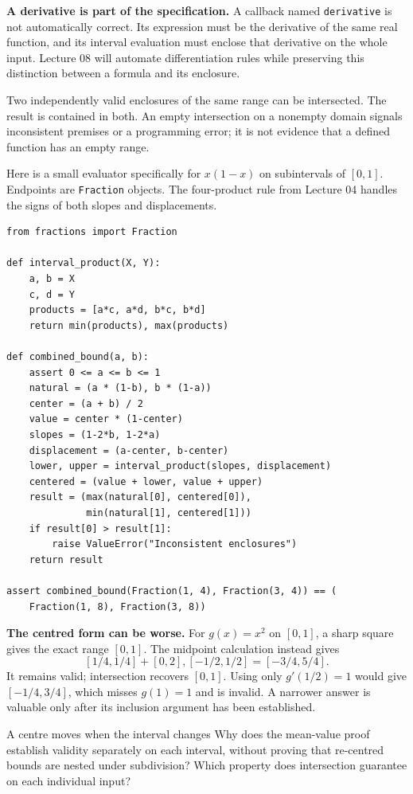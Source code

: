 \textbf{A derivative is part of the specification.} A callback named
\texttt{derivative} is not automatically correct. Its expression must be the
derivative of the same real function, and its interval evaluation must enclose
that derivative on the whole input. Lecture 08 will automate differentiation
rules while preserving this distinction between a formula and its enclosure.

\newpage
{}
Two independently valid enclosures of the same range can be intersected.
The result is contained in both. An empty intersection on a nonempty domain
signals inconsistent premises or a programming error; it is not evidence that
a defined function has an empty range.

Here is a small evaluator specifically for $x(1-x)$ on subintervals of $[0,1]$.
Endpoints are \texttt{Fraction} objects. The four-product rule from Lecture 04
handles the signs of both slopes and displacements.
\begin{lstlisting}
from fractions import Fraction

def interval_product(X, Y):
    a, b = X
    c, d = Y
    products = [a*c, a*d, b*c, b*d]
    return min(products), max(products)

def combined_bound(a, b):
    assert 0 <= a <= b <= 1
    natural = (a * (1-b), b * (1-a))
    center = (a + b) / 2
    value = center * (1-center)
    slopes = (1-2*b, 1-2*a)
    displacement = (a-center, b-center)
    lower, upper = interval_product(slopes, displacement)
    centered = (value + lower, value + upper)
    result = (max(natural[0], centered[0]),
              min(natural[1], centered[1]))
    if result[0] > result[1]:
        raise ValueError("Inconsistent enclosures")
    return result

assert combined_bound(Fraction(1, 4), Fraction(3, 4)) == (
    Fraction(1, 8), Fraction(3, 8))
\end{lstlisting}

\textbf{The centred form can be worse.} For $g(x)=x^2$ on $[0,1]$, a sharp
square gives the exact range $[0,1]$. The midpoint calculation instead gives
\[
 [1/4,1/4]+[0,2],[-1/2,1/2]=[-3/4,5/4].
\]
It remains valid; intersection recovers $[0,1]$. Using only $g'(1/2)=1$ would
give $[-1/4,3/4]$, which misses $g(1)=1$ and is invalid. A narrower answer
is valuable only after its inclusion argument has been established.

\begin{question}{A centre moves when the interval changes}
Why does the mean-value proof establish validity separately on each interval,
without proving that re-centred bounds are nested under subdivision? Which
property does intersection guarantee on each individual input?
\end{question}

